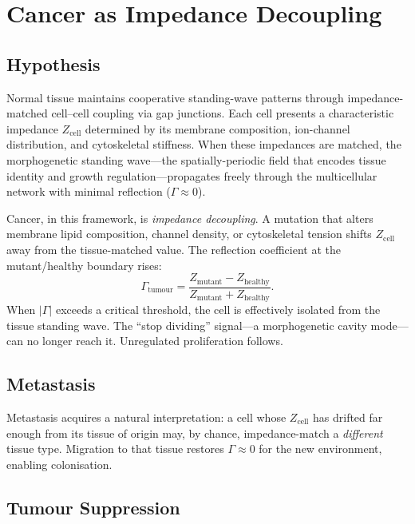 \section{Cancer as Impedance Decoupling}
\label{sec:cancer_impedance}

\subsection{Hypothesis}

Normal tissue maintains cooperative standing-wave patterns through
impedance-matched cell--cell coupling via gap junctions.  Each cell
presents a characteristic impedance $Z_{\mathrm{cell}}$ determined
by its membrane composition, ion-channel distribution, and
cytoskeletal stiffness.  When these impedances are matched, the
morphogenetic standing wave---the spatially-periodic field that
encodes tissue identity and growth regulation---propagates freely
through the multicellular network with minimal reflection
($\Gamma \approx 0$).

Cancer, in this framework, is \emph{impedance decoupling}.  A
mutation that alters membrane lipid composition, channel density,
or cytoskeletal tension shifts $Z_{\mathrm{cell}}$ away from the
tissue-matched value.  The reflection coefficient at the
mutant/healthy boundary rises:
\begin{equation}
  \Gamma_{\mathrm{tumour}} 
  = \frac{Z_{\mathrm{mutant}} - Z_{\mathrm{healthy}}}
         {Z_{\mathrm{mutant}} + Z_{\mathrm{healthy}}}.
\end{equation}
When $|\Gamma|$ exceeds a critical threshold, the cell is
effectively isolated from the tissue standing wave.  The ``stop
dividing'' signal---a morphogenetic cavity mode---can no longer
reach it.  Unregulated proliferation follows.

\subsection{Metastasis}

Metastasis acquires a natural interpretation: a cell whose
$Z_{\mathrm{cell}}$ has drifted far enough from its tissue of
origin may, by chance, impedance-match a \emph{different} tissue
type.  Migration to that tissue restores $\Gamma \approx 0$ for
the new environment, enabling colonisation.

\subsection{Tumour Suppression}

